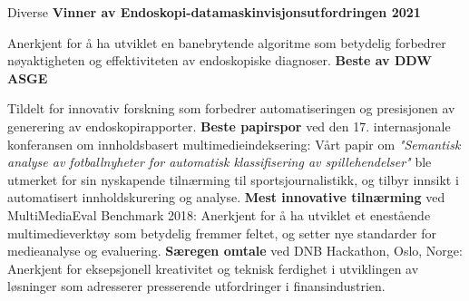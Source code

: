 \begin{rubric}{Diverse}
\entry*[] \textbf{Vinner av Endoskopi-datamaskinvisjonsutfordringen 2021} \par
Anerkjent for å ha utviklet en banebrytende algoritme som betydelig forbedrer nøyaktigheten og effektiviteten av endoskopiske diagnoser.
%
\entry*[] \textbf{Beste av DDW ASGE} \par
Tildelt for innovativ forskning som forbedrer automatiseringen og presisjonen av generering av endoskopirapporter.
%
\entry*[] \textbf{Beste papirspor} ved den 17. internasjonale konferansen om innholdsbasert multimedieindeksering: Vårt papir om \textit{"Semantisk analyse av fotballnyheter for automatisk klassifisering av spillehendelser"} ble utmerket for sin nyskapende tilnærming til sportsjournalistikk, og tilbyr innsikt i automatisert innholdskurering og analyse.
%
\entry*[] \textbf{Mest innovative tilnærming} ved MultiMediaEval Benchmark 2018: Anerkjent for å ha utviklet et enestående multimedieverktøy som betydelig fremmer feltet, og setter nye standarder for medieanalyse og evaluering.
%
\entry*[] \textbf{Særegen omtale} ved DNB Hackathon, Oslo, Norge: Anerkjent for eksepsjonell kreativitet og teknisk ferdighet i utviklingen av løsninger som adresserer presserende utfordringer i finansindustrien.
\end{rubric}
